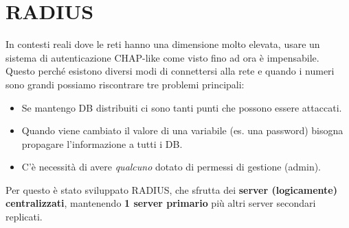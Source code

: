 \chapter{RADIUS}
In contesti reali dove le reti hanno una dimensione molto elevata, usare un sistema di autenticazione CHAP-like come visto fino ad ora è impensabile. Questo perché esistono diversi modi di connettersi alla rete e quando i numeri sono grandi possiamo riscontrare tre problemi principali:
\begin{itemize}
    \item Se mantengo DB distribuiti ci sono tanti punti che possono essere attaccati.
    \item Quando viene cambiato il valore di una variabile (es. una password) bisogna propagare l'informazione a tutti i DB.
    \item C'è necessità di avere \textit{qualcuno} dotato di permessi di gestione (admin).
\end{itemize}
Per questo è stato sviluppato RADIUS, che sfrutta dei \textbf{server (logicamente) centralizzati}, mantenendo \textbf{1 server primario} più altri server secondari replicati.
